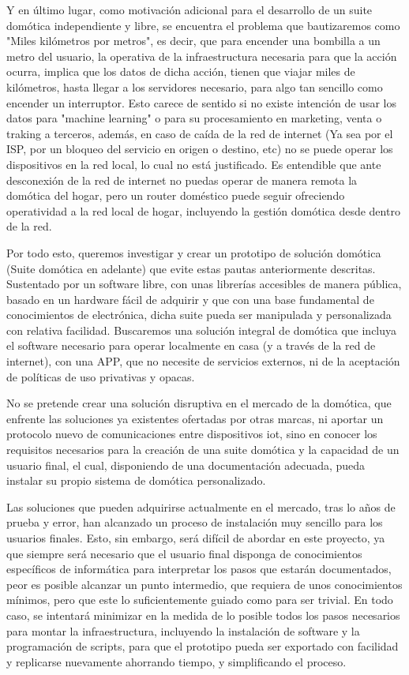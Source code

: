 Y en último lugar, como motivación adicional para el desarrollo de un suite domótica independiente y libre, se encuentra el problema que bautizaremos como "Miles kilómetros por metros", es decir, que para encender una bombilla a un metro del usuario, la operativa de la infraestructura necesaria para que la acción ocurra, implica que los datos de dicha acción, tienen que viajar miles de kilómetros, hasta llegar a los servidores necesario, para algo tan sencillo como encender un interruptor. Esto carece de sentido si no existe intención de usar los datos para "machine learning" o para su procesamiento en marketing, venta o traking a terceros, además, en caso de caída de la red de internet (Ya sea por el ISP, por un bloqueo del servicio en origen o destino, etc) no se puede operar los dispositivos en la red local, lo cual no está justificado. Es entendible que ante desconexión de la red de internet no puedas operar de manera remota la domótica del hogar, pero un router doméstico puede seguir ofreciendo operatividad a la red local de hogar, incluyendo la gestión domótica desde dentro de la red.

Por todo esto, queremos investigar y crear un prototipo de solución domótica (Suite domótica en adelante) que evite estas pautas anteriormente descritas. Sustentado por un software libre, con unas librerías accesibles de manera pública, basado en un hardware fácil de adquirir y que con una base fundamental de conocimientos de electrónica, dicha suite pueda ser manipulada y personalizada con relativa facilidad. Buscaremos una solución integral de domótica que incluya el software necesario para operar localmente en casa (y a través de la red de internet), con una APP, que no necesite de servicios externos, ni de la aceptación de políticas de uso privativas y opacas.

No se pretende crear una solución disruptiva en el mercado de la domótica, que enfrente las soluciones ya existentes ofertadas por otras marcas, ni aportar un protocolo nuevo de comunicaciones entre dispositivos \gls{iot}, sino en conocer los requisitos necesarios para la creación de una suite domótica y la capacidad de un usuario final, el cual, disponiendo de una documentación adecuada, pueda instalar su propio sistema de domótica personalizado.

Las soluciones que pueden adquirirse actualmente en el mercado, tras lo años de prueba y error, han alcanzado un proceso de instalación muy sencillo para los usuarios finales. Esto, sin embargo, será difícil de abordar en este proyecto, ya que siempre será necesario que el usuario final disponga de conocimientos específicos de informática para interpretar los pasos que estarán documentados, peor es posible alcanzar un punto intermedio, que requiera de unos conocimientos mínimos, pero que este lo suficientemente guiado como para ser trivial. En todo caso, se intentará minimizar en la medida de lo posible todos los pasos necesarios para montar la infraestructura, incluyendo la instalación de software y la programación de scripts, para que el prototipo pueda ser exportado con facilidad y replicarse nuevamente ahorrando tiempo, y simplificando el proceso.

